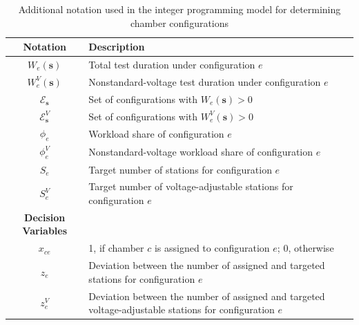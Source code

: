 \begin{table}[H]
\caption{Additional notation used in the integer programming model for determining chamber configurations}
\label{tab:notation_ccd}
\centering
\small
\begin{tabular}{cl}
\toprule
\textbf{Notation} & \textbf{Description}\\
\midrule
\(W_e(\mathbf{s})\) & Total test duration under configuration \(e\) \\
\(W_e^V(\mathbf{s})\) & Nonstandard-voltage test duration under configuration \(e\) \\
\(\mathcal{E}_\mathbf{s}\) & Set of configurations with \(W_e(\mathbf{s})>0\) \\
\(\mathcal{E}^V_\mathbf{s}\) & Set of configurations with \(W_e^V(\mathbf{s})>0\) \\
\(\phi_e\) & Workload share of configuration \(e\) \\
\(\phi_e^V\) & Nonstandard-voltage workload share of configuration \(e\) \\
\(S_e\) & Target number of stations for configuration \(e\) \\
\(S_e^V\) & Target number of voltage-adjustable stations for configuration \(e\) \\
\midrule
\textbf{Decision Variables} & \\
\midrule
\(x_{ce}\) & 1, if chamber \(c\) is assigned to configuration \(e\); 0, otherwise \\
\(z_e\) & \shortstack[l]{Deviation between the number of assigned and\\targeted stations for configuration \(e\)} \\
\(z_e^V\) & \shortstack[l]{Deviation between the number of assigned and\\targeted voltage-adjustable stations for configuration \(e\)} \\
\bottomrule
\end{tabular}
\end{table}




